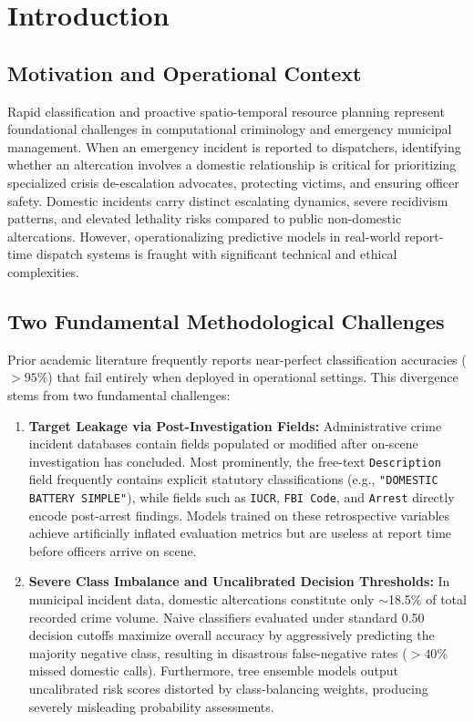 \documentclass[runningheads]{llncs}
\begin{document}
\section{Introduction}
\subsection{Motivation and Operational Context}
Rapid classification and proactive spatio-temporal resource planning represent foundational challenges in computational criminology and emergency municipal management. When an emergency incident is reported to dispatchers, identifying whether an altercation involves a domestic relationship is critical for prioritizing specialized crisis de-escalation advocates, protecting victims, and ensuring officer safety. Domestic incidents carry distinct escalating dynamics, severe recidivism patterns, and elevated lethality risks compared to public non-domestic altercations. However, operationalizing predictive models in real-world report-time dispatch systems is fraught with significant technical and ethical complexities.

\subsection{Two Fundamental Methodological Challenges}
Prior academic literature frequently reports near-perfect classification accuracies ($>95\%$) that fail entirely when deployed in operational settings. This divergence stems from two fundamental challenges:
\begin{enumerate}
    \item \textbf{Target Leakage via Post-Investigation Fields:} Administrative crime incident databases contain fields populated or modified after on-scene investigation has concluded. Most prominently, the free-text \texttt{Description} field frequently contains explicit statutory classifications (e.g., \texttt{"DOMESTIC BATTERY SIMPLE"}), while fields such as \texttt{IUCR}, \texttt{FBI Code}, and \texttt{Arrest} directly encode post-arrest findings. Models trained on these retrospective variables achieve artificially inflated evaluation metrics but are useless at report time before officers arrive on scene.
    \item \textbf{Severe Class Imbalance and Uncalibrated Decision Thresholds:} In municipal incident data, domestic altercations constitute only $\sim$18.5\% of total recorded crime volume. Naive classifiers evaluated under standard 0.50 decision cutoffs maximize overall accuracy by aggressively predicting the majority negative class, resulting in disastrous false-negative rates ($>40\%$ missed domestic calls). Furthermore, tree ensemble models output uncalibrated risk scores distorted by class-balancing weights, producing severely misleading probability assessments.
\end{enumerate}
\end{document}

